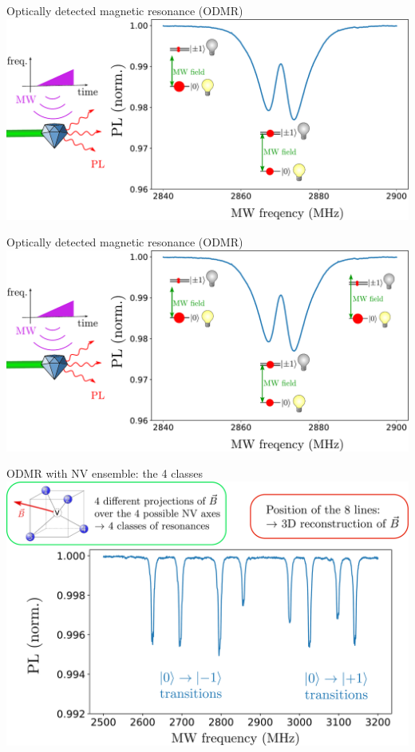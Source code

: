 \documentclass{beamer}
\begin{document}
\begin{frame}{Optically detected magnetic resonance (ODMR)}
\centering
\includegraphics[width=\textwidth,height=0.80\textheight,keepaspectratio]{Slide_ODMR_0_-1}
\end{frame}

\begin{frame}{Optically detected magnetic resonance (ODMR)}
\centering
\includegraphics[width=\textwidth,height=0.80\textheight,keepaspectratio]{Slide_ODMR_0}
\end{frame}

\begin{frame}{ODMR with NV ensemble: the 4 classes}
\centering
\includegraphics[width=\textwidth,height=0.85\textheight,keepaspectratio]{Slide_ODMR_8_classes}
\end{frame}
\end{document}

